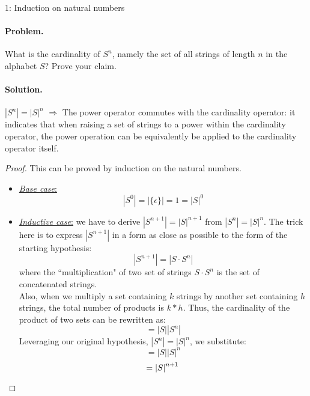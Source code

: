 \documentclass{article}
\begin{document}
			\begin{exercise}{ 1: Induction on natural numbers}
				\paragraph{Problem.}
				What is the cardinality of $S^n$, namely the set of all strings of length $n$ in the alphabet $S$? Prove your claim.\\
				\paragraph{Solution.}
				\mbox{}
				\vspace{0.1cm}
				
				$\left\lvert S^n\right\rvert=\left\lvert S\right\rvert^n$ $\Rightarrow$ The power operator commutes with the cardinality operator: it indicates that when raising a set of strings to a power within the cardinality operator, the power operation can be equivalently be applied to the cardinality operator itself.
				\vspace{0.15cm}
				
				\begin{proof}
					This can be proved by induction on the natural numbers.
					\begin{itemize}
    					\item \uline{\textit{Base case}:}
    					$$|S^0|=|\{\epsilon\}|=1=|S|^0$$
    					\item \uline{\textit{Inductive case}:} we have to derive $\left\lvert S^{n+1}\right\rvert= \left\lvert S\right\rvert^{n+1}$ from $\left\lvert S^n\right\rvert= \left\lvert S\right\rvert^n$. The trick here is to express $\left\lvert S^{n+1}\right\rvert$ in a form as close as possible to the form of the starting hypothesis:
        				$$\left\lvert S^{n+1}\right\rvert = \left\lvert S\cdot S^n\right\rvert$$
        				where the ``multiplication" of two set of strings $S \cdot S^n$ is the set of concatenated strings.\\
        				Also, when we multiply a set containing $k$ strings by another set containing $h$ strings, the total number of products is $k*h$. Thus, the cardinality of the product of two sets can be rewritten as:
        				$$=\left\lvert S\right\rvert \left\lvert S^n\right\rvert$$
        				Leveraging our original hypothesis, $\left\lvert S^n\right\rvert=\left\lvert S\right\rvert^n$, we substitute:
        				$$=\left\lvert S\right\rvert \left\lvert S\right\rvert^n$$
        				\begin{equation*}
							=\left\lvert S\right\rvert^{n+1} \qedhere
						\end{equation*}
					\end{itemize} 
				\end{proof}
			\end{exercise}
\end{document}
